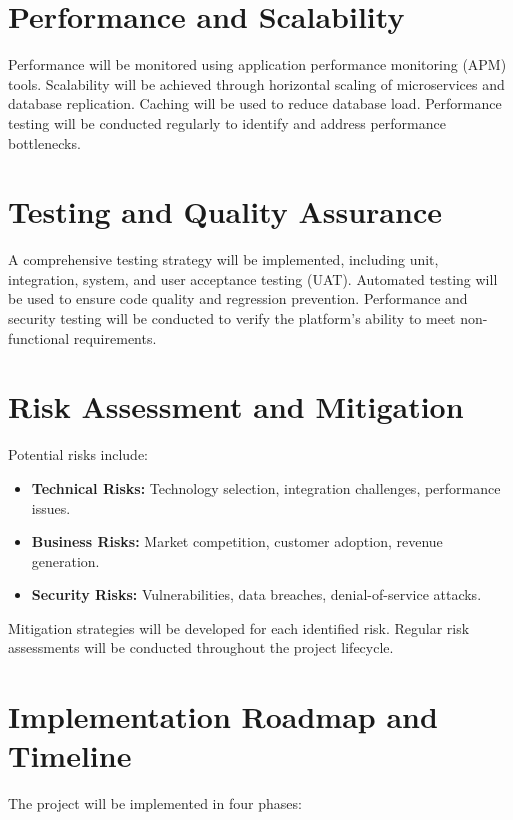 \documentclass[11pt,a4paper,oneside]{article}
\begin{document}
\section{Performance and Scalability}

Performance will be monitored using application performance monitoring (APM) tools.  Scalability will be achieved through horizontal scaling of microservices and database replication.  Caching will be used to reduce database load.  Performance testing will be conducted regularly to identify and address performance bottlenecks.

\section{Testing and Quality Assurance}

A comprehensive testing strategy will be implemented, including unit, integration, system, and user acceptance testing (UAT).  Automated testing will be used to ensure code quality and regression prevention.  Performance and security testing will be conducted to verify the platform's ability to meet non-functional requirements.

\section{Risk Assessment and Mitigation}

Potential risks include:

\begin{itemize}
    \item \textbf{Technical Risks:}  Technology selection, integration challenges, performance issues.
    \item \textbf{Business Risks:}  Market competition, customer adoption, revenue generation.
    \item \textbf{Security Risks:}  Vulnerabilities, data breaches, denial-of-service attacks.
\end{itemize}

Mitigation strategies will be developed for each identified risk.  Regular risk assessments will be conducted throughout the project lifecycle.

\section{Implementation Roadmap and Timeline}

The project will be implemented in four phases:
\end{document}
